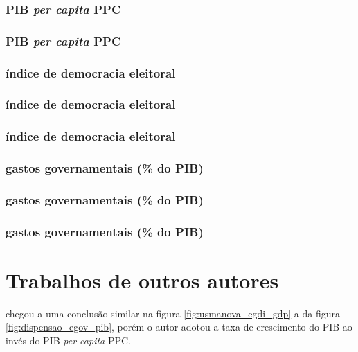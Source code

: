 \subsubsection{PIB \textit{per capita} PPC}

\subsubsection{PIB \textit{per capita} PPC}

\subsubsection{índice de democracia eleitoral}

\subsubsection{índice de democracia eleitoral}

\subsubsection{índice de democracia eleitoral}

\subsubsection{gastos governamentais (\% do PIB)}

\subsubsection{gastos governamentais (\% do PIB)}

\subsubsection{gastos governamentais (\% do PIB)}

\section{Trabalhos de outros autores}

\cite{alisherovna2021whether} chegou a uma conclusão similar na figura \ref{fig:usmanova_egdi_gdp} a da figura \ref{fig:dispensao_egov_pib}, porém o autor adotou a taxa de crescimento do PIB ao invés do PIB \textit{per capita} PPC.


